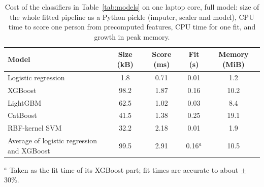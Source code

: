 \begin{table}[!htbp]
\caption{Cost of the classifiers in Table~\ref{tab:models} on one laptop core, full model: size of the whole fitted pipeline as a Python pickle (imputer, scaler and model), CPU time to score one person from precomputed features, CPU time for one fit, and growth in peak memory.}\label{tab:modelcost}
\footnotesize\setlength{\tabcolsep}{4pt}
\begin{tabular}{@{}lcccc@{}}
\toprule
Model & Size (kB) & Score (ms) & Fit (s) & Memory (MiB) \\
\midrule
Logistic regression & 1.8 & 0.71 & 0.01 & 1.2 \\
XGBoost & 98.2 & 1.87 & 0.16 & 10.2 \\
LightGBM & 62.5 & 1.02 & 0.03 & 8.4 \\
CatBoost & 41.5 & 1.38 & 0.25 & 19.1 \\
RBF-kernel SVM & 32.2 & 2.18 & 0.01 & 1.9 \\
Average of logistic regression and XGBoost & 99.5 & 2.91 & 0.16$^{a}$ & 10.5 \\
\bottomrule
\end{tabular}
\begin{flushleft}\scriptsize
$^{a}$ Taken as the fit time of its XGBoost part; fit times are accurate to about $\pm$30\%.
\end{flushleft}
\end{table}
